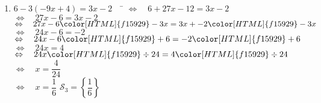 \documentclass[a4paper,11pt,exos]{nsi} %
\begin{document}
\begin{enumerate}
    \item 	\begin{tabbing}
        $ 6-3(-9x+4)=3x-2 \quad$	\=	$\Leftrightarrow\quad 6+27x-12=3x-2 $\\
        \>	$\Leftrightarrow\quad   27x-6=3x-2 $\\
        \>	$\Leftrightarrow\quad   27x-6{\color[HTML]{f15929}-3x}=3x+-2{\color[HTML]{f15929}-3x} $\\
        \>	$\Leftrightarrow\quad   24x-6=-2 $\\
        \>	$\Leftrightarrow\quad   24x-6{\color[HTML]{f15929}+6}=-2{\color[HTML]{f15929}+6} $\\
        \>	$\Leftrightarrow\quad   24x=4 $\\
        \>	$\Leftrightarrow\quad	24x{\color[HTML]{f15929}\div24}=4{\color[HTML]{f15929}\div24} $\\
        \>	$\Leftrightarrow\quad	x=\dfrac{4}{24} $\\
        \>	$\Leftrightarrow\quad	x=\dfrac{1}{6}$ \hspace{4cm} $\mathcal{S}_3=\left\{ \dfrac{1}{6} \right\}$
    \end{tabbing}

\end{enumerate}
\end{document}
